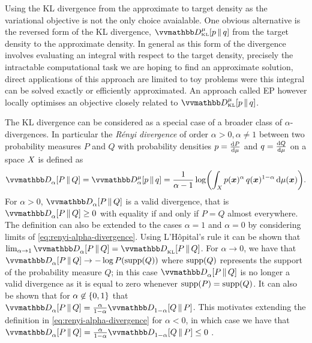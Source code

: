 Using the \ac{KL} divergence from the approximate to target density as the variational objective is not the only choice avaialable. One obvious alternative is the reversed form of the \ac{KL} divergence, $\kldiv[\mu]{\tgtdens}{q}$ from the target density to the approximate density. In general as this form of the divergence involves evaluating an integral with respect to the target density, precisely the intractable computational task we are hoping to find an approximate solution, direct applications of this approach are limited to toy problems were this integral can be solved exactly or efficiently approximated. An approach called \ac{EP} \citep{minka2001expectation} however locally optimises an objective closely related to $\kldiv[\mu]{\tgtdens}{q}$. %

The \ac{KL} divergence can be considered as a special case of a broader class of $\alpha$-divergences. In particular the \emph{R\'{e}nyi divergence} \citep{renyi1961measures,van2014renyi} of order $\alpha > 0, \alpha \neq 1$ between two probability measures $P$ and $Q$ with probability densities $p = \frac{\mathrm{d} P}{\mathrm{d} \mu}$ and $q = \frac{\mathrm{d} Q}{\mathrm{d} \mu}$ on a space $\mathit{X}$ is defined as
\begin{equation}\label{eq:renyi-alpha-divergence}
  \rdiv{\alpha}{P}{Q} =
  \rdiv[\mu]{\alpha}{p}{q} =
  \frac{1}{\alpha -1} \log \lpa \int_{\set{X}} p(\vct{x})^\alpha\,q(\vct{x})^{1-\alpha}\,\dr\mu(\vct{x})\rpa.
\end{equation}
For $\alpha > 0$, $\rdiv{\alpha}{P}{Q}$ is a valid divergence, that is $\rdiv{\alpha}{P}{Q} \geq 0$ with equality if and only if $P = Q$ almost everywhere. The definition can also be extended to the cases $\alpha = 1$ and $\alpha=0$ by considering limits of \eqref{eq:renyi-alpha-divergence}. Using L'H\^{o}pital's rule it can be shown that $\lim_{\alpha \to 1} \rdiv{\alpha}{P}{Q} = \kldiv{P}{Q}$. For $\alpha \to 0$, we have that $\rdiv{\alpha}{P}{Q} \to -\log P\lpa\support(Q)\rpa$ where $\operatorname{supp}(Q)$ represents the support of the probability measure $Q$; in this case $\rdiv{\alpha}{P}{Q}$ is no longer a valid divergence as it is equal to zero whenever $\operatorname{supp}(P) = \operatorname{supp}(Q)$. It can also be shown that for $\alpha \not\in \fset{0,1}$ that $\rdiv{\alpha}{P}{Q} = \frac{\alpha}{1-\alpha}\rdiv{1-\alpha}{Q}{P}$. This motivates extending the definition in \eqref{eq:renyi-alpha-divergence} for $\alpha < 0$, in which case we have that $\rdiv{\alpha}{P}{Q} = \frac{\alpha}{1-\alpha}\rdiv{1-\alpha}{Q}{P} \leq 0$ \citep{li2016renyi}.


